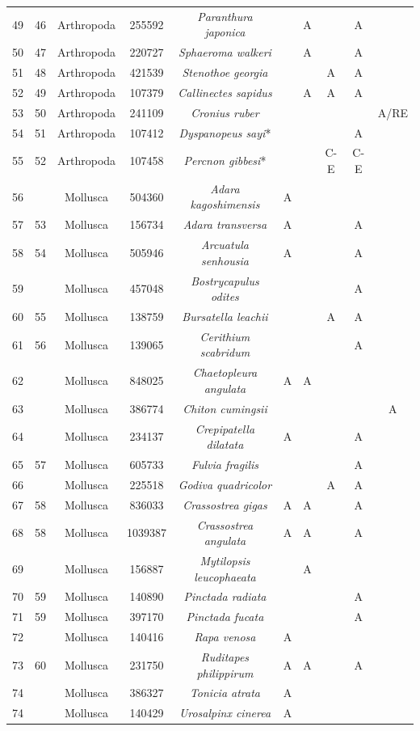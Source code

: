 \documentclass{article}
\begin{document}
\begin{landscape}
\begin{center}
\begin{longtable}{|c|c|c|c|c|c|c|c|c|c|}
49&46&Arthropoda&255592&\textit{Paranthura japonica}&&A&&A&\\
50&47&Arthropoda&220727&\textit{Sphaeroma walkeri}&&A&&A&\\
51&48&Arthropoda&421539&\textit{Stenothoe georgia}&&&A&A&\\
52&49&Arthropoda&107379&\textit{Callinectes sapidus}&&A&A&A&\\
53&50&Arthropoda&241109&\textit{Cronius ruber}&&&&&A/RE\\
54&51&Arthropoda&107412&\textit{Dyspanopeus sayi}*&&&&A&\\
55&52&Arthropoda&107458&\textit{Percnon gibbesi}*&&&C-E&C-E&\\
56&&Mollusca&504360&\textit{Adara kagoshimensis}&A&&&&\\
57&53&Mollusca&156734&\textit{Adara transversa}&A&&&A&\\
58&54&Mollusca&505946&\textit{Arcuatula senhousia}&A&&&A&\\
59&&Mollusca&457048&\textit{Bostrycapulus odites}&&&&A&\\
60&55&Mollusca&138759&\textit{Bursatella leachii}&&&A&A&\\
61&56&Mollusca&139065&\textit{Cerithium scabridum}&&&&A&\\
62&&Mollusca&848025&\textit{Chaetopleura angulata}&A&A&&&\\
63&&Mollusca&386774&\textit{Chiton cumingsii}&&&&&A\\
64&&Mollusca&234137&\textit{Crepipatella dilatata}&A&&&A&\\
65&57&Mollusca&605733&\textit{Fulvia fragilis}&&&&A&\\
66&&Mollusca&225518&\textit{Godiva quadricolor}&&&A&A&\\
67&58&Mollusca&836033&\textit{Crassostrea gigas}&A&A&&A&\\
68&58&Mollusca&1039387&\textit{Crassostrea angulata}&A&A&&A&\\
69&&Mollusca&156887&\textit{Mytilopsis leucophaeata}&&A&&&\\
70&59&Mollusca&140890&\textit{Pinctada radiata}&&&&A&\\
71&59&Mollusca&397170&\textit{Pinctada fucata}&&&&A&\\
72&&Mollusca&140416&\textit{Rapa venosa}&A&&&&\\
73&60&Mollusca&231750&\textit{Ruditapes philippirum}&A&A&&A&\\
74&&Mollusca&386327&\textit{Tonicia atrata}&A&&&&\\
74&&Mollusca&140429&\textit{Urosalpinx cinerea}&A&&&&\\

\end{longtable}
\end{center}
\end{landscape}
\end{document}
